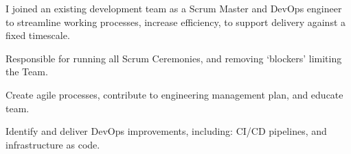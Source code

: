 I joined an existing development team as a Scrum Master and DevOps engineer to streamline working processes, increase efficiency, to support delivery against a fixed timescale.
\vspace{0.25em}
\begin{tightemize}
  \item Responsible for running all Scrum Ceremonies, and removing `blockers' limiting the Team.
  \item Create agile processes, contribute to engineering management plan, and educate team.
  \item Identify and deliver DevOps improvements, including: CI/CD pipelines, and infrastructure as code.
\end{tightemize}
\sectionsep{}
